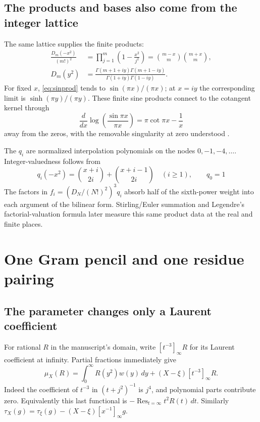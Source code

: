 \documentclass[11pt]{article}
\theoremstyle{definition}
\theoremstyle{remark}\newtheorem*{remark}{Remark}
\newcommand{\Res}{\operatorname{Res}}
\newcommand{\dd}{\,d}
\begin{document}
\subsection{The products and bases also come from the integer lattice}
The same lattice supplies the finite products:
\begin{align}
 \frac{D_m(-x^2)}{(m!)^2}
 &=\prod_{j=1}^m\left(1-\frac{x^2}{j^2}\right)
 =\binom{m-x}{m}\binom{m+x}{m},\label{eq:sinprod}\\
 D_m(y^2)&=
 \frac{\Gamma(m+1+iy)\Gamma(m+1-iy)}
      {\Gamma(1+iy)\Gamma(1-iy)}.\label{eq:gammaprod}
\end{align}
For fixed $x$, \eqref{eq:sinprod} tends to $\sin(\pi x)/(\pi x)$;
at $x=iy$ the corresponding limit is $\sinh(\pi y)/(\pi y)$.
These finite sine products connect to the cotangent kernel through
\[
 \frac d{dx}\log\!\left(\frac{\sin\pi x}{\pi x}\right)
 =\pi\cot\pi x-\frac1x
\]
away from the zeros, with the removable singularity at zero understood
\cite{Cotangent,Gamma}.

The $q_i$ are normalized interpolation polynomials on the nodes
$0,-1,-4,\ldots$. Integer-valuedness follows from
\[
 q_i(-x^2)=\binom{x+i}{2i}+\binom{x+i-1}{2i}\quad(i\ge1),
 \qquad q_0=1
\]
The factors in $f_i=(D_N/(N!)^2)^3q_i$ absorb half
of the sixth-power weight into each argument of the bilinear form.
Stirling/Euler summation and Legendre's factorial-valuation formula later
measure this same product data at the real and finite places.

\section{One Gram pencil and one residue pairing}

\subsection{The parameter changes only a Laurent coefficient}
For rational $R$ in the manuscript's domain, write $[t^{-3}]_\infty R$ for its
Laurent coefficient at infinity. Partial fractions immediately give
\begin{equation}\label{eq:mastermu}
 \boxed{\displaystyle
 \mu_X(R)=\int_0^\infty R(y^2)w(y)\dd y
             +(X-\xi)[t^{-3}]_\infty R.}
\end{equation}
Indeed the coefficient of $t^{-3}$ in $(t+j^2)^{-1}$ is $j^4$, and polynomial
parts contribute zero. Equivalently this last functional is
$-\Res_{t=\infty}t^2R(t)\dd t$.
Similarly $\tau_X(g)=\tau_\xi(g)-(X-\xi)[x^{-1}]_\infty g$.
\end{document}
